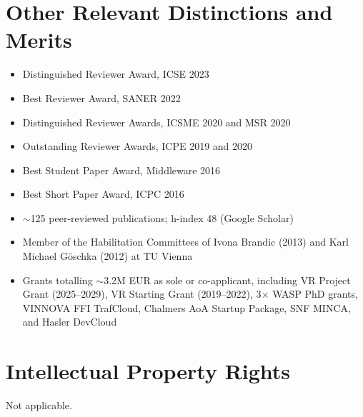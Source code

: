\documentclass[a4paper,11pt]{article}
\begin{document}
\section{Other Relevant Distinctions and Merits}

\begin{itemize}
  \item Distinguished Reviewer Award, ICSE 2023
  \item Best Reviewer Award, SANER 2022
  \item Distinguished Reviewer Awards, ICSME 2020 and MSR 2020
  \item Outstanding Reviewer Awards, ICPE 2019 and 2020
  \item Best Student Paper Award, Middleware 2016
  \item Best Short Paper Award, ICPC 2016
  \item $\sim$125 peer-reviewed publications; h-index 48 (Google Scholar)
  \item Member of the Habilitation Committees of Ivona Brandic (2013) and Karl Michael Göschka (2012) at TU Vienna
  \item Grants totalling $\sim$3.2M EUR as sole or co-applicant, including VR Project Grant (2025--2029), VR Starting Grant (2019--2022), 3$\times$ WASP PhD grants, VINNOVA FFI TrafCloud, Chalmers AoA Startup Package, SNF MINCA, and Hasler DevCloud
\end{itemize}

\section{Intellectual Property Rights}

Not applicable.
\end{document}
